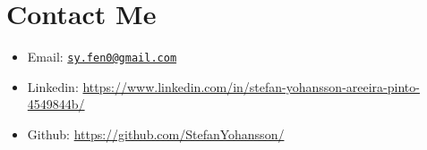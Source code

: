 \documentclass[
]{article}
\providecommand{\tightlist}{%
  \setlength{\itemsep}{0pt}\setlength{\parskip}{0pt}}
\begin{document}
\hypertarget{contact-me}{%
\section{Contact Me}\label{contact-me}}

\begin{itemize}
\tightlist
\item
  Email: \href{mailto:sy.fen0@gmail.com}{\nolinkurl{sy.fen0@gmail.com}}
\item
  Linkedin:
  \url{https://www.linkedin.com/in/stefan-yohansson-areeira-pinto-4549844b/}
\item
  Github: \url{https://github.com/StefanYohansson/}
\end{itemize}
\end{document}
